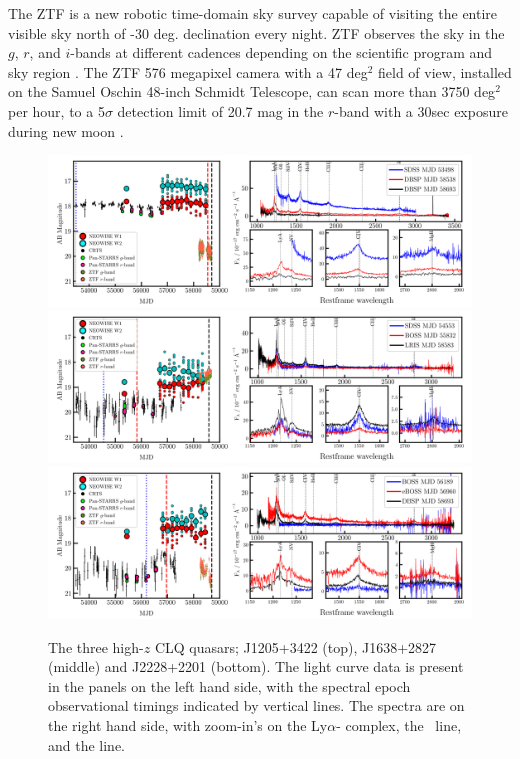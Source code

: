 \documentclass[fleqn,usenatbib]{mnras}
\begin{document}
The ZTF is a new robotic time-domain sky survey capable of visiting
the entire visible sky north of -30 deg. declination every night. ZTF
observes the sky in the $g$, $r$, and $i$-bands at different cadences
depending on the scientific program and sky region
\citep{Bellm2019_ZTFSurveys, Graham2019_ZTF}. The ZTF 576 megapixel
camera with a 47 deg$^{2}$ field of view, installed on the Samuel
Oschin 48-inch Schmidt Telescope, can scan more than 3750 deg$^{2}$
per hour, to a 5$\sigma$ detection limit of 20.7 mag in the $r$-band
with a 30sec exposure during new moon \citep{Masci2019}.
\begin{figure}
  \centering
  \includegraphics[width=16.7cm, trim=0.3cm 0.05cm 0.45cm 0.1cm, clip]
  {figures/J1205+3422_landscape_20191112.png}
  \includegraphics[width=16.7cm, trim=0.3cm 0.05cm 0.40cm 0.1cm, clip]
  {figures/J1638+2827_landscape_20191112.png}
  \includegraphics[width=16.7cm, trim=0.3cm 0.0cm  0.35cm 0.1cm, clip]
  {figures/J2228+2201_landscape_20191112.png}
  \vspace{-12pt}
  \caption[]{The three high-$z$ CLQ quasars; 
    J1205+3422 (top), 
    J1638+2827 (middle) and  
    J2228+2201 (bottom). 
    The light curve data is present in the panels on the left hand side, with the 
    spectral epoch observational timings indicated by vertical lines. 
    The spectra are on the right hand side, with zoom-in's on the Ly$\alpha$-\nv 
    complex, the \civ\ line, and the \mgii line.}
  \label{fig:civ_clqs}
\end{figure}
\end{document}
